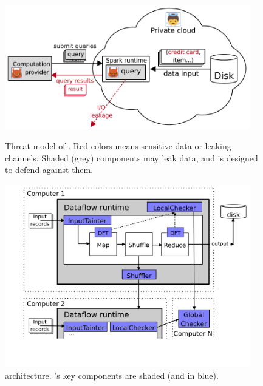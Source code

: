 \begin{figure}[h]
    \centering
    \begin{minipage}{.48\textwidth}    
          \vspace{-.1in}
        \includegraphics[width=0.95\textwidth]{figures/threat_private.pdf}
         \vspace{-.1in}         
        \caption{Threat model of \kakute. Red colors means sensitive data or 
leaking channels. Shaded (grey) components may leak data, and \kakute is 
designed to defend against them.}
        \label{fig:falcon-arch}
    \end{minipage}
    \hspace{.1in}
    \centering
    \begin{minipage}{0.48\textwidth}
         \vspace{-.1in}
        \includegraphics[width=0.95\textwidth]{figures/kakute_arch.pdf}
         \vspace{-.4in}
        \caption{\kakute architecture. \kakute's key components are shaded 
(and in blue).}
        \label{fig:falcon-protocol}
    \end{minipage}
\end{figure}


